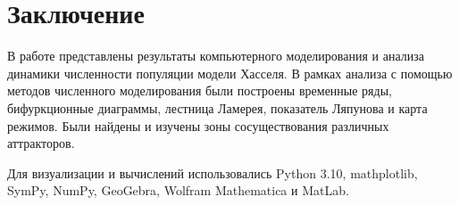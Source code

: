 \section{Заключение}

    В работе представлены результаты компьютерного моделирования и анализа динамики численности популяции модели Хасселя. В рамках анализа с помощью методов численного моделирования были построены временные ряды, бифуркционные диаграммы, лестница Ламерея, показатель Ляпунова и карта режимов. Были найдены и изучены зоны сосуществования различных аттракторов.

    Для визуализации и вычислений использовались Python 3.10, mathplotlib, SymPy, NumPy, GeoGebra, Wolfram Mathematica и MatLab.
